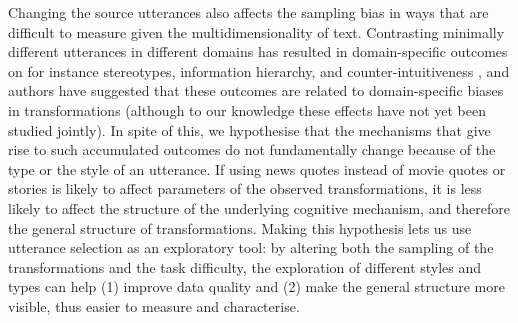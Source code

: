 \documentclass[a4paper,fleqn]{cas-dc}
\begin{document}
Changing the source utterances also affects the sampling bias in ways
that are difficult to measure given the multidimensionality of text.
Contrasting minimally different utterances in different domains has
resulted in domain-specific outcomes on for instance stereotypes,
information hierarchy, and counter-intuitiveness
\citep{kashima_maintaining_2000,mesoudi_bias_2006,barrett_spreading_2001,mesoudi_multiple_2008},
and authors have suggested that these outcomes are related to
domain-specific biases in transformations (although to our knowledge
these effects have not yet been studied jointly). In spite of this, we
hypothesise that
the mechanisms that give rise to such
accumulated outcomes do not fundamentally change because of the type or
the style of an utterance. If using news quotes instead of movie quotes
or stories is likely to affect parameters of the observed
transformations, it is less likely to affect the structure of the
underlying cognitive mechanism, and therefore the general structure of
transformations. Making this hypothesis lets us use utterance selection
as an exploratory tool: by altering both the sampling of the
transformations and the task difficulty, the exploration of different
styles and types can help (1) improve data quality and (2) make the
general structure more visible, thus easier to measure and characterise.
\end{document}
